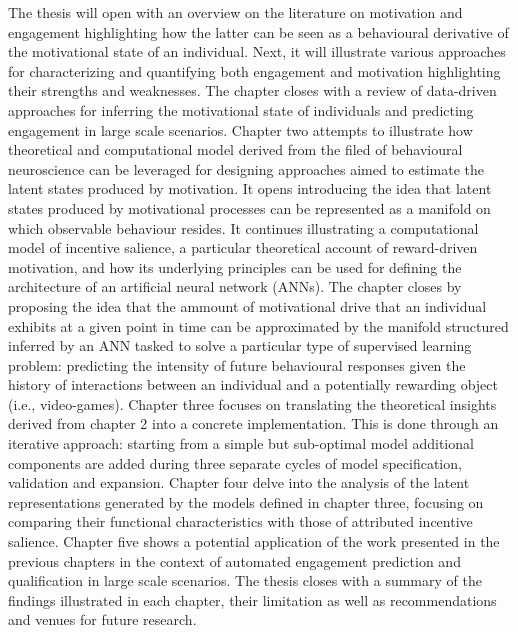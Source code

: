 The thesis will open with an overview on the literature on motivation and engagement highlighting how the latter can be seen as a behavioural derivative of the motivational state of an individual. Next, it will illustrate various approaches for characterizing and quantifying both engagement and motivation highlighting their strengths and weaknesses. The chapter closes with a review of data-driven approaches for inferring the motivational state of individuals and predicting engagement in large scale scenarios. Chapter two attempts to illustrate how theoretical and computational model derived from the filed of behavioural neuroscience can be leveraged for designing approaches aimed to estimate the latent states produced by motivation. It opens introducing the idea that latent states produced by motivational processes can be represented as a manifold on which observable behaviour resides. It continues illustrating a computational model of incentive salience, a particular theoretical account of reward-driven motivation, and how its underlying principles can be used for defining the architecture of an artificial neural network (ANNs). The chapter closes by proposing the idea that the ammount of motivational drive that an individual exhibits at a given point in time can be approximated by the manifold structured inferred by an ANN tasked to solve a particular type of supervised learning problem: predicting the intensity of future behavioural responses given the history of interactions between an individual and a potentially rewarding object (i.e., video-games). Chapter three focuses on translating the theoretical insights derived from chapter 2 into a concrete implementation. This is done through an iterative approach: starting from a simple but sub-optimal model additional components are added during three separate cycles of model specification, validation and expansion. Chapter four delve into the analysis of the latent representations generated by the models defined in chapter three, focusing on comparing their functional characteristics with those of attributed incentive salience. Chapter five shows a potential application of the work presented in the previous chapters in the context of automated engagement prediction and qualification in large scale scenarios. The thesis closes with a summary of the findings illustrated in each chapter, their limitation as well as recommendations and venues for future research.


